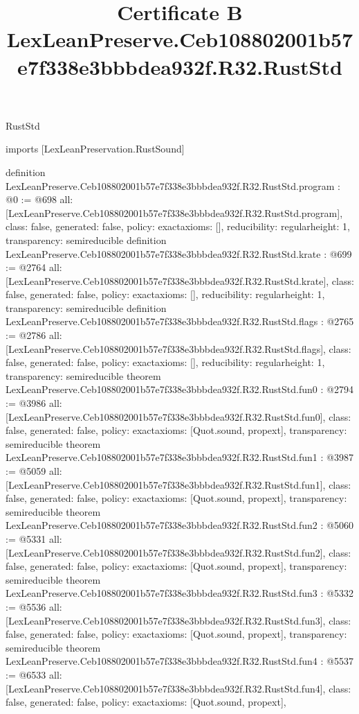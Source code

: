 \begin{lexlean}{RustStd}
\title{Certificate B LexLeanPreserve.Ceb108802001b57e7f338e3bbbdea932f.R32.RustStd}
\begin{coremodule}
imports [LexLeanPreservation.RustSound]

definition LexLeanPreserve.Ceb108802001b57e7f338e3bbbdea932f.R32.RustStd.program : @0 := @698 {
  all: [LexLeanPreserve.Ceb108802001b57e7f338e3bbbdea932f.R32.RustStd.program],
  class: false,
  generated: false,
  policy: exact{axioms: []},
  reducibility: regular{height: 1},
  transparency: semireducible
}
definition LexLeanPreserve.Ceb108802001b57e7f338e3bbbdea932f.R32.RustStd.krate : @699 := @2764 {
  all: [LexLeanPreserve.Ceb108802001b57e7f338e3bbbdea932f.R32.RustStd.krate],
  class: false,
  generated: false,
  policy: exact{axioms: []},
  reducibility: regular{height: 1},
  transparency: semireducible
}
definition LexLeanPreserve.Ceb108802001b57e7f338e3bbbdea932f.R32.RustStd.flags : @2765 := @2786 {
  all: [LexLeanPreserve.Ceb108802001b57e7f338e3bbbdea932f.R32.RustStd.flags],
  class: false,
  generated: false,
  policy: exact{axioms: []},
  reducibility: regular{height: 1},
  transparency: semireducible
}
theorem LexLeanPreserve.Ceb108802001b57e7f338e3bbbdea932f.R32.RustStd.fun0 : @2794 := @3986 {
  all: [LexLeanPreserve.Ceb108802001b57e7f338e3bbbdea932f.R32.RustStd.fun0],
  class: false,
  generated: false,
  policy: exact{axioms: [Quot.sound, propext]},
  transparency: semireducible
}
theorem LexLeanPreserve.Ceb108802001b57e7f338e3bbbdea932f.R32.RustStd.fun1 : @3987 := @5059 {
  all: [LexLeanPreserve.Ceb108802001b57e7f338e3bbbdea932f.R32.RustStd.fun1],
  class: false,
  generated: false,
  policy: exact{axioms: [Quot.sound, propext]},
  transparency: semireducible
}
theorem LexLeanPreserve.Ceb108802001b57e7f338e3bbbdea932f.R32.RustStd.fun2 : @5060 := @5331 {
  all: [LexLeanPreserve.Ceb108802001b57e7f338e3bbbdea932f.R32.RustStd.fun2],
  class: false,
  generated: false,
  policy: exact{axioms: [Quot.sound, propext]},
  transparency: semireducible
}
theorem LexLeanPreserve.Ceb108802001b57e7f338e3bbbdea932f.R32.RustStd.fun3 : @5332 := @5536 {
  all: [LexLeanPreserve.Ceb108802001b57e7f338e3bbbdea932f.R32.RustStd.fun3],
  class: false,
  generated: false,
  policy: exact{axioms: [Quot.sound, propext]},
  transparency: semireducible
}
theorem LexLeanPreserve.Ceb108802001b57e7f338e3bbbdea932f.R32.RustStd.fun4 : @5537 := @6533 {
  all: [LexLeanPreserve.Ceb108802001b57e7f338e3bbbdea932f.R32.RustStd.fun4],
  class: false,
  generated: false,
  policy: exact{axioms: [Quot.sound, propext]},
}
\end{coremodule}
\end{lexlean}
